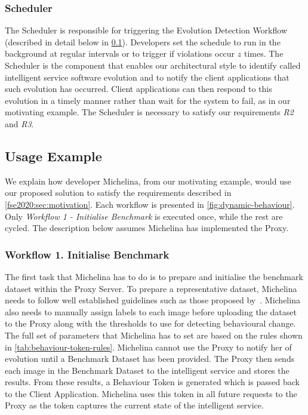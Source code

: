 \subsubsection{Scheduler} The Scheduler is responsible for triggering the Evolution Detection Workflow (described in detail below in \cref{fse2020:sec:workflow}). Developers set the schedule to run in the background at regular intervals or to trigger if violations occur $z$ times. The Scheduler is the component that enables our architectural style to identify called intelligent service software evolution and to notify the client applications that such evolution has occurred. Client applications can then respond to this evolution in a timely manner rather than wait for the system to fail, as in our motivating example. The Scheduler is necessary to satisfy our requirements \textit{R2} and \textit{R3}.


\subsection{Usage Example}
\label{fse2020:sec:workflow}

We explain how developer Michelina, from our motivating example, would use our proposed solution to satisfy the requirements described in \cref{fse2020:sec:motivation}. Each workflow is presented in \cref{fig:dynamic-behaviour}. Only \textit{Workflow 1 - Initialise Benchmark} is executed once, while the rest are cycled. The description below assumes Michelina has implemented the Proxy.

\subsubsection{Workflow 1. Initialise Benchmark}

The first task that Michelina has to do is to prepare and initialise the benchmark dataset within the Proxy Server. To prepare a representative dataset, Michelina needs to follow well established guidelines such as those proposed by~\citeauthor{pyle1999data}. Michelina also needs to manually assign labels to each image before uploading the dataset to the Proxy along with the thresholds to use for detecting behavioural change. The full set of parameters that Michelina has to set are based on the rules shown in \cref{tab:behaviour-token-rules}. Michelina cannot use the Proxy to notify her of evolution until a Benchmark Dataset has been provided. The Proxy then sends each image in the Benchmark Dataset to the intelligent service and stores the results. From these results, a Behaviour Token is generated which is passed back to the Client Application. Michelina uses this token in all future requests to the Proxy as the token captures the current state of the intelligent service.     


